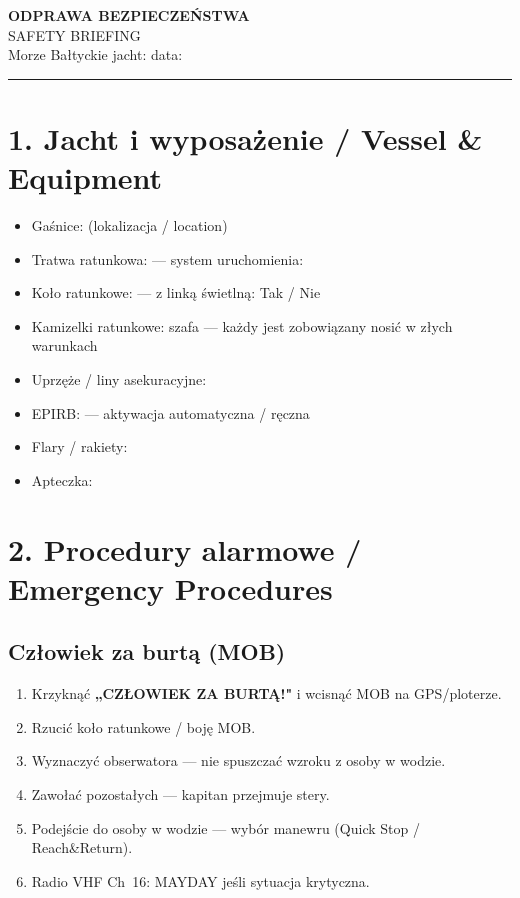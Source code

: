 \documentclass[a4paper,11pt]{article}
\begin{document}

\begin{center}
    {\Large\bfseries\color{pzzblue} ODPRAWA BEZPIECZEŃSTWA}\\
    {\large SAFETY BRIEFING}\\[4pt]
    {\normalsize Morze Bałtyckie \textbullet{} jacht: \field{5cm} \textbullet{} data: \field{3cm}}
\end{center}

\vspace{0.3cm}
\noindent\rule{\linewidth}{1pt}

\section*{1. Jacht i wyposażenie / Vessel \& Equipment}

\begin{itemize}[noitemsep]
    \item Gaśnice: \field{5cm} (lokalizacja / location)
    \item Tratwa ratunkowa: \field{5cm} — system uruchomienia: \field{3cm}
    \item Koło ratunkowe: \field{4cm} — z linką świetlną: Tak / Nie
    \item Kamizelki ratunkowe: szafa \field{3cm} — każdy jest zobowiązany nosić w złych warunkach
    \item Uprzęże / liny asekuracyjne: \field{5cm}
    \item EPIRB: \field{5cm} — aktywacja automatyczna / ręczna
    \item Flary / rakiety: \field{5cm}
    \item Apteczka: \field{4cm}
\end{itemize}

\section*{2. Procedury alarmowe / Emergency Procedures}

\subsection*{Człowiek za burtą (MOB)}
\begin{enumerate}[noitemsep]
    \item Krzyknąć \textbf{„CZŁOWIEK ZA BURTĄ!"} i wcisnąć MOB na GPS/ploterze.
    \item Rzucić koło ratunkowe / boję MOB.
    \item Wyznaczyć obserwatora — nie spuszczać wzroku z osoby w wodzie.
    \item Zawołać pozostałych — kapitan przejmuje stery.
    \item Podejście do osoby w wodzie — wybór manewru (Quick Stop / Reach\&Return).
    \item Radio VHF Ch~16: MAYDAY jeśli sytuacja krytyczna.
\end{enumerate}
\end{document}
